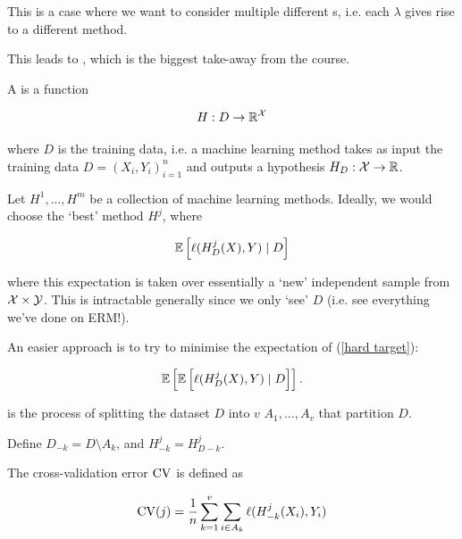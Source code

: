 \documentclass[11pt]{scrartcl}
\begin{document}
This is a case where we want to consider multiple different s, i.e. each $\lambda$ gives rise to a different method.

This leads to , which is the biggest take-away from the course.

\begin{definition}
A  is a function

\begin{equation}
    H : D \rightarrow \mathbb R^{\mathcal{X}}
\end{equation}

where $D$ is the training data, i.e. a machine learning method takes as input the training data $D = (X_i, Y_i)_{i=1}^n$ and outputs a hypothesis $H_D : \mathcal{X} \rightarrow \mathbb R$.
\end{definition}

Let $H^1, ... , H^m$ be a collection of machine learning methods. Ideally, we would choose the `best' method $H^j$, where

\begin{equation}
    \mathbb{E} \left[  \ell (H_D^j(X), Y) \mid D  \right]
\label{hard target}
\end{equation}

where this expectation is taken over essentially a `new' independent sample from $\mathcal{X} \times \mathcal{Y}$. This is intractable generally since we only `see' $D$ (i.e. see everything we've done on ERM!).

An easier approach is to try to minimise the expectation of (\ref{hard target}):

\begin{equation}
    \mathbb{E} \left[  \mathbb{E} \left[  \ell (H_D^j(X), Y) \mid D  \right]  \right].
\label{easier cross validation target}
\end{equation}

\begin{definition}
 is the process of splitting the dataset $D$ into $v$  $A_1, ... , A_v$ that partition $D$.

Define $D_{-k} = D \setminus A_k$, and $H_{-k}^j=H_{D-k}^j$.
\end{definition}

\begin{definition}
The cross-validation error $\text{CV}$ is defined as

\begin{equation}
    \text{CV}(j) = \frac1n \sum_{k=1}^v \sum_{i \in A_k} \ell(H^j_{-k}(X_i), Y_i)
\end{equation}
\label{cv def}
\end{definition}
\end{document}
